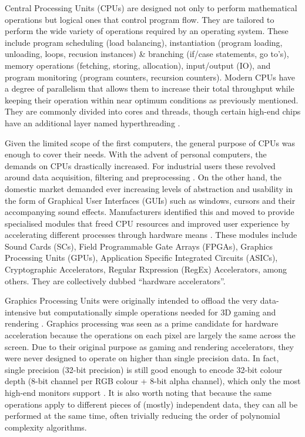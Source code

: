 Central Processing Units (CPUs) are designed not only to perform mathematical operations but logical ones that control program flow. They are tailored to perform the wide variety of operations required by an operating system. These include program scheduling (load balancing), instantiation (program loading, unloading, loops, recusion instances) \& branching (if/case statements, go to's), memory operations (fetching, storing, allocation), input/output (IO), and program monitoring (program counters, recursion counters). Modern CPUs have a degree of parallelism that allows them to increase their total throughput while keeping their operation within near optimum conditions as previously mentioned. They are commonly divided into cores and threads, though certain high-end chips have an additional layer named hyperthreading \cite{cpu_arch}.

Given the limited scope of the first computers, the general purpose of CPUs was enough to cover their needs. With the advent of personal computers, the demands on CPUs drastically increased. For industrial users these revolved around data acquisition, filtering and preprocessing \cite{fpga, preproc, filtering}. On the other hand, the domestic market demanded ever increasing levels of abstraction and usability in the form of Graphical User Interfaces (GUIs) such as windows, cursors and their accompanying sound effects. Manufacturers identified this and moved to provide specialised modules that freed CPU resources and improved user experience by accelerating different processes through hardware means \cite{gpu1, gpu2, gpu3, sound}. These modules include Sound Cards (SCs), Field Programmable Gate Arrays (FPGAs), Graphics Processing Units (GPUs), Application Specific Integrated Circuits (ASICs), Cryptographic Accelerators, Regular Rxpression (RegEx) Accelerators, among others. They are collectively dubbed ``hardware accelerators''.

Graphics Processing Units were originally intended to offload the very data-intensive but computationally simple operations needed for 3D gaming and rendering \cite{gpu1, gpu2, gpu3}. Graphics processing was seen as a prime candidate for hardware acceleration because the operations on each pixel are largely the same across the screen. Due to their original purpose as gaming and rendering accelerators, they were never designed to operate on higher than single precision data. In fact, single precision (32-bit precision) is still good enough to encode 32-bit colour depth (8-bit channel per RGB colour + 8-bit alpha channel), which only the most high-end monitors support \cite{monitor}. It is also worth noting that because the same operations apply to different pieces of (mostly) independent data, they can all be performed at the same time, often trivially reducing the order of polynomial complexity algorithms.

